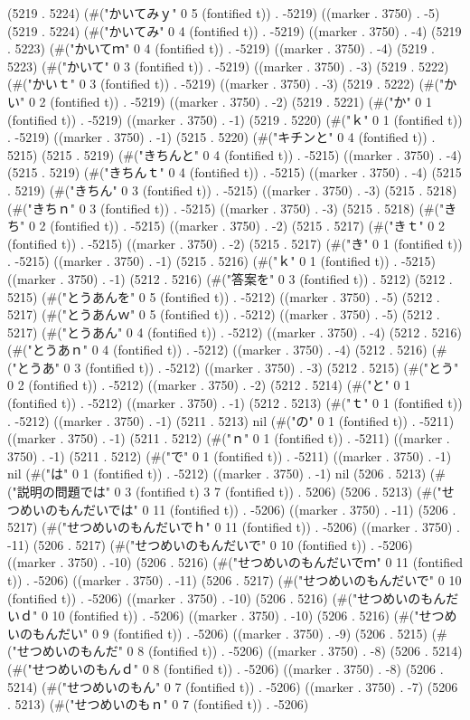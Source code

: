 {{(5219 . 5224) (#("かいてみｙ" 0 5 (fontified t)) . -5219) ((marker . 3750) . -5) (5219 . 5224) (#("かいてみ" 0 4 (fontified t)) . -5219) ((marker . 3750) . -4) (5219 . 5223) (#("かいてｍ" 0 4 (fontified t)) . -5219) ((marker . 3750) . -4) (5219 . 5223) (#("かいて" 0 3 (fontified t)) . -5219) ((marker . 3750) . -3) (5219 . 5222) (#("かいｔ" 0 3 (fontified t)) . -5219) ((marker . 3750) . -3) (5219 . 5222) (#("かい" 0 2 (fontified t)) . -5219) ((marker . 3750) . -2) (5219 . 5221) (#("か" 0 1 (fontified t)) . -5219) ((marker . 3750) . -1) (5219 . 5220) (#("ｋ" 0 1 (fontified t)) . -5219) ((marker . 3750) . -1) (5215 . 5220) (#("キチンと" 0 4 (fontified t)) . 5215) (5215 . 5219) (#("きちんと" 0 4 (fontified t)) . -5215) ((marker . 3750) . -4) (5215 . 5219) (#("きちんｔ" 0 4 (fontified t)) . -5215) ((marker . 3750) . -4) (5215 . 5219) (#("きちん" 0 3 (fontified t)) . -5215) ((marker . 3750) . -3) (5215 . 5218) (#("きちｎ" 0 3 (fontified t)) . -5215) ((marker . 3750) . -3) (5215 . 5218) (#("きち" 0 2 (fontified t)) . -5215) ((marker . 3750) . -2) (5215 . 5217) (#("きｔ" 0 2 (fontified t)) . -5215) ((marker . 3750) . -2) (5215 . 5217) (#("き" 0 1 (fontified t)) . -5215) ((marker . 3750) . -1) (5215 . 5216) (#("ｋ" 0 1 (fontified t)) . -5215) ((marker . 3750) . -1) (5212 . 5216) (#("答案を" 0 3 (fontified t)) . 5212) (5212 . 5215) (#("とうあんを" 0 5 (fontified t)) . -5212) ((marker . 3750) . -5) (5212 . 5217) (#("とうあんｗ" 0 5 (fontified t)) . -5212) ((marker . 3750) . -5) (5212 . 5217) (#("とうあん" 0 4 (fontified t)) . -5212) ((marker . 3750) . -4) (5212 . 5216) (#("とうあｎ" 0 4 (fontified t)) . -5212) ((marker . 3750) . -4) (5212 . 5216) (#("とうあ" 0 3 (fontified t)) . -5212) ((marker . 3750) . -3) (5212 . 5215) (#("とう" 0 2 (fontified t)) . -5212) ((marker . 3750) . -2) (5212 . 5214) (#("と" 0 1 (fontified t)) . -5212) ((marker . 3750) . -1) (5212 . 5213) (#("ｔ" 0 1 (fontified t)) . -5212) ((marker . 3750) . -1) (5211 . 5213) nil (#("の" 0 1 (fontified t)) . -5211) ((marker . 3750) . -1) (5211 . 5212) (#("ｎ" 0 1 (fontified t)) . -5211) ((marker . 3750) . -1) (5211 . 5212) (#("で" 0 1 (fontified t)) . -5211) ((marker . 3750) . -1) nil (#("は" 0 1 (fontified t)) . -5212) ((marker . 3750) . -1) nil (5206 . 5213) (#("説明の問題では" 0 3 (fontified t) 3 7 (fontified t)) . 5206) (5206 . 5213) (#("せつめいのもんだいでは" 0 11 (fontified t)) . -5206) ((marker . 3750) . -11) (5206 . 5217) (#("せつめいのもんだいでｈ" 0 11 (fontified t)) . -5206) ((marker . 3750) . -11) (5206 . 5217) (#("せつめいのもんだいで" 0 10 (fontified t)) . -5206) ((marker . 3750) . -10) (5206 . 5216) (#("せつめいのもんだいでｍ" 0 11 (fontified t)) . -5206) ((marker . 3750) . -11) (5206 . 5217) (#("せつめいのもんだいで" 0 10 (fontified t)) . -5206) ((marker . 3750) . -10) (5206 . 5216) (#("せつめいのもんだいｄ" 0 10 (fontified t)) . -5206) ((marker . 3750) . -10) (5206 . 5216) (#("せつめいのもんだい" 0 9 (fontified t)) . -5206) ((marker . 3750) . -9) (5206 . 5215) (#("せつめいのもんだ" 0 8 (fontified t)) . -5206) ((marker . 3750) . -8) (5206 . 5214) (#("せつめいのもんｄ" 0 8 (fontified t)) . -5206) ((marker . 3750) . -8) (5206 . 5214) (#("せつめいのもん" 0 7 (fontified t)) . -5206) ((marker . 3750) . -7) (5206 . 5213) (#("せつめいのもｎ" 0 7 (fontified t)) . -5206) }}
